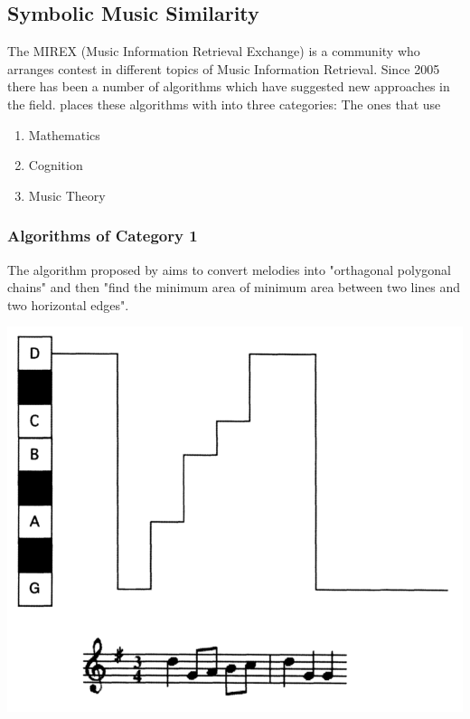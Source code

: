 \documentclass{article}
\begin{document}
		\subsection*{Symbolic Music Similarity}

			The MIREX (Music Information Retrieval Exchange) is a community who arranges contest in different topics of Music Information Retrieval. Since 2005 there has been a number of algorithms which have suggested new approaches in the field.
			\cite{two} places these algorithms with into three categories:
				The ones that use \label{categories}
				\begin{enumerate}
					\item Mathematics
					\item Cognition
					\item Music Theory
				\end{enumerate}

			\subsubsection*{Algorithms of Category 1}
				The algorithm proposed by \cite{one} aims to convert melodies into "orthagonal polygonal chains" and then "find the minimum area of 
				minimum area between two lines and two horizontal edges".

				\includegraphics{figure_1_of_1}
 
\end{document}
